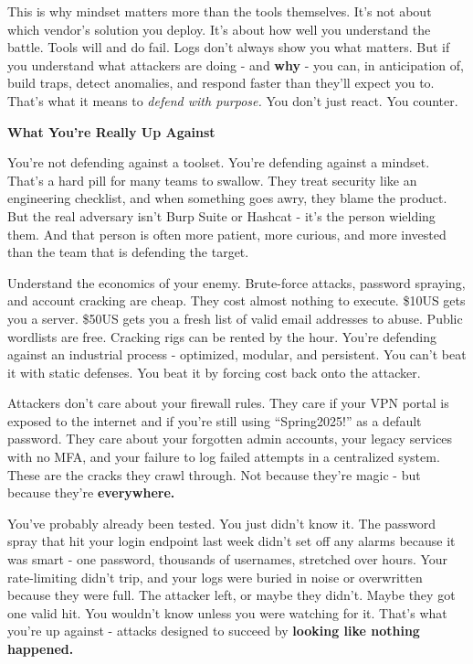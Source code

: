 This is why mindset matters more than the tools themselves. It’s not about which vendor’s solution you deploy. It’s about how well you understand the battle. Tools will and do fail. Logs don’t always show you what matters. But if you understand what attackers are doing - and \textbf{why} - you can, in anticipation of, build traps, detect anomalies, and respond faster than they’ll expect you to. That’s what it means to \textit{defend with purpose. }You don’t just react. You counter.

\textbf{What You’re Really Up Against}

You’re not defending against a toolset. You’re defending against a mindset. That’s a hard pill for many teams to swallow. They treat security like an engineering checklist, and when something goes awry, they blame the product. But the real adversary isn’t Burp Suite or Hashcat - it’s the person wielding them. And that person is often more patient, more curious, and more invested than the team that is defending the target.

Understand the economics of your enemy. Brute-force attacks, password spraying, and account cracking are cheap. They cost almost nothing to execute. \$10US gets you a server. \$50US gets you a fresh list of valid email addresses to abuse. Public wordlists are free. Cracking rigs can be rented by the hour. You’re defending against an industrial process - optimized, modular, and persistent. You can’t beat it with static defenses. You beat it by forcing cost back onto the attacker.

Attackers don’t care about your firewall rules. They care if your VPN portal is exposed to the internet and if you’re still using “Spring2025!” as a default password. They care about your forgotten admin accounts, your legacy services with no MFA, and your failure to log failed attempts in a centralized system. These are the cracks they crawl through. Not because they’re magic - but because they’re \textbf{everywhere.}

You’ve probably already been tested. You just didn’t know it. The password spray that hit your login endpoint last week didn’t set off any alarms because it was smart - one password, thousands of usernames, stretched over hours. Your rate-limiting didn’t trip, and your logs were buried in noise or overwritten because they were full. The attacker left, or maybe they didn’t. Maybe they got one valid hit. You wouldn’t know unless you were watching for it. That’s what you’re up against - attacks designed to succeed by \textbf{looking like nothing happened.}

